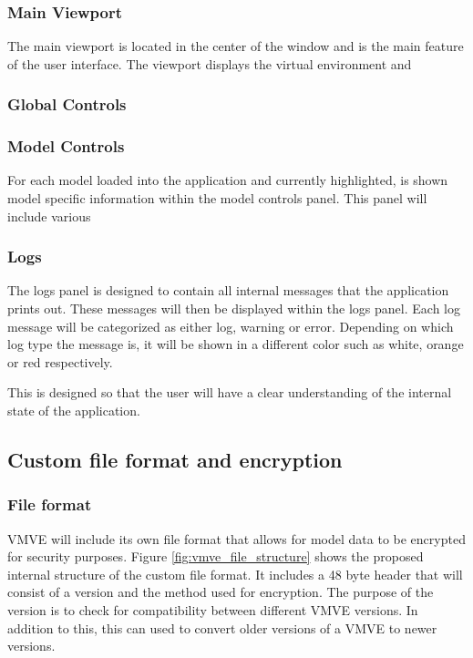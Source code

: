 \documentclass[11pt]{article}
\begin{document}
\subsubsection{Main Viewport}
The main viewport is located in the center of the window and is the main feature
of the user interface. The viewport displays the virtual environment and 

\subsubsection{Global Controls}

\subsubsection{Model Controls}

For each model loaded into the application and currently highlighted, is shown
model specific information within the model controls panel. This panel will include various 


\subsubsection{Logs}
The logs panel is designed to contain all internal messages that the application
prints out. These messages will then be displayed within the logs panel. Each
log message will be categorized as either log, warning or error. Depending on
which log type the message is, it will be shown in a different color such as
white, orange or red respectively.

This is designed so that the user will have a clear understanding of the internal state
of the application.

\subsection{Custom file format and encryption}

\subsubsection{File format}
VMVE will include its own file format that allows for model data to be encrypted for security purposes.
Figure \ref{fig:vmve_file_structure} shows the proposed internal structure of the custom file format.
It includes a 48 byte header that will consist of a version and the method used for encryption.
The purpose of the version is to check for compatibility between different VMVE versions. In addition to this,
this can used to convert older versions of a VMVE to newer versions.
\end{document}
